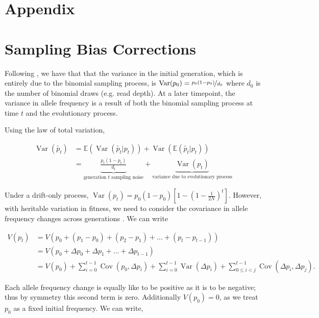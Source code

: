 \documentclass[11pt]{article}
\newcommand{\E}{\mathbb{E}}
\DeclareMathOperator{\var}{Var}
\DeclareMathOperator{\cov}{Cov}
\begin{document}
\section{Appendix}

\section{Sampling Bias Corrections}

Following \textcite{Waples1989-sj}, we have that that the variance in the
initial generation, which is entirely due to the binomial sampling process, is
$\var(p_0) = \nicefrac{p_0(1-p_0)}{d_0}$ where $d_0$ is the number of binomial
draws (e.g. read depth). At a later timepoint, the variance in allele frequency
is a result of both the binomial sampling process at time $t$ and the
evolutionary process.

Using the law of total variation, 

\begin{align}
  \var(\widetilde{p_t}) &= \E(\var(\widetilde{p_t} | p_t)) + \var(\E(\widetilde{p_t}|p_t)) \\
                        &= \underbrace{\frac{p_t(1-p_t)}{d_t}}_\text{generation $t$ sampling noise} + \underbrace{\var(p_t)}_\text{variance due to evolutionary process}
\end{align}

Under a drift-only process, $\var(p_t) = p_0(1-p_0)\left[1- \left(1 -
\frac{1}{2N}\right)^t\right]$. However, with heritable variation in fitness, we
need to consider the covariance in allele frequency changes across generations
\parencite{Buffalo2019-io}. We can write

\begin{align}
  V(p_t) &= V\left(p_0 + (p_1 - p_0) + (p_2 - p_1) + \ldots + (p_t - p_{t-1}) \right) \\
         &= V\left(p_0 + \Delta p_0 + \Delta p_1 + \ldots + \Delta p_{t-1} \right) \\
         &= V(p_0) + \sum_{i=0}^{t-1} \cov(p_0, \Delta p_i) + \sum_{i=0}^{t-1} \var(\Delta p_i) + \sum_{0 \le i < j}^{t-1} \cov(\Delta p_i, \Delta p_j).
\end{align}
%

Each allele frequency change is equally like to be positive as it is to be
negative; thus by symmetry this second term is zero. Additionally $V(p_0) = 0$,
as we treat $p_0$ as a fixed initial frequency. We can write, 
\end{document}
